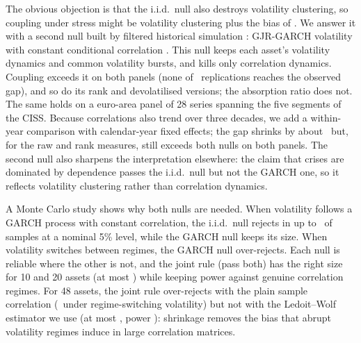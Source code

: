 \documentclass[12pt]{article}
\theoremstyle{definition}
\theoremstyle{remark}
\begin{document}
\begin{doublespace}
The obvious objection is that the i.i.d.\ null also destroys volatility
clustering, so coupling under stress might be volatility clustering plus the
bias of \citet{forbes2002}. We answer it with a second null built by filtered
historical simulation \citep{baroneadesi1999}: GJR-GARCH volatility
\citep{gjr1993} with constant conditional correlation \citep{bollerslev1990}.
This null keeps each asset's volatility dynamics and common volatility bursts,
and kills only correlation dynamics. Coupling exceeds it on both panels
(none of \nRep\ replications reaches the observed gap), and so do its
rank and devolatilised versions; the absorption ratio does not. The same holds
on a euro-area panel of 28 series spanning the five segments of the CISS.
Because correlations also trend over three decades, we add a within-year
comparison with calendar-year fixed effects; the gap shrinks by about
\gnSpFeShrink\ but, for the raw and rank measures, still exceeds both nulls on
both panels. The second null also sharpens the interpretation elsewhere: the claim
that crises are dominated by dependence passes the i.i.d.\ null but not the
GARCH one, so it reflects volatility clustering rather than correlation
dynamics.

A Monte Carlo study shows why both nulls are needed. When volatility follows a
GARCH process with constant correlation, the i.i.d.\ null rejects in up to
\mcIidWorst\ of samples at a nominal 5\% level, while the GARCH null keeps its
size. When volatility switches between regimes, the GARCH null over-rejects.
Each null is reliable where the other is not, and the joint rule (pass both)
has the right size for 10 and 20 assets (at most \mcBothWorstSmallN) while
keeping power against genuine correlation regimes. For 48 assets, the joint
rule over-rejects with the plain sample correlation (\mcSampleMsvolBothFortyEight\
under regime-switching volatility) but not with the Ledoit--Wolf estimator we
use (at most \mcLwBothWorst, power \mcLwPow): shrinkage removes the bias that
abrupt volatility regimes induce in large correlation matrices.


\end{doublespace}
\end{document}
